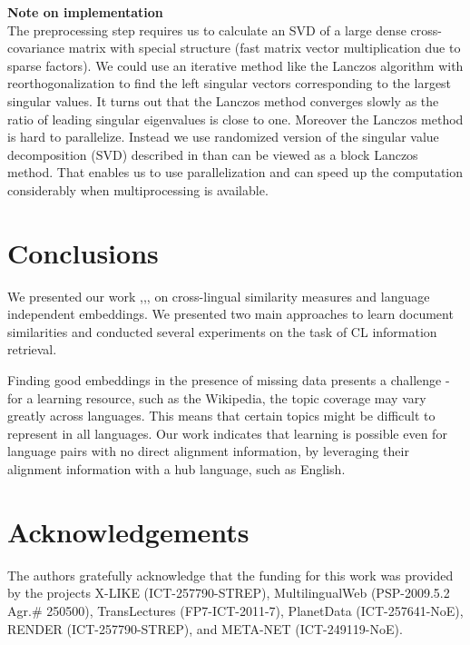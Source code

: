 \documentclass{article} %
\begin{document}
\textbf{Note on implementation}\\
The preprocessing step requires us to calculate an SVD of a large dense cross-covariance matrix with special structure (fast matrix vector multiplication due to sparse factors). We could use an iterative method like the Lanczos algorithm\cite{golub} with reorthogonalization to find the left singular vectors corresponding to the largest singular values. It turns out that the Lanczos method converges slowly as the ratio of leading singular eigenvalues is close to one. Moreover the Lanczos method is hard to parallelize. Instead we use randomized version of the singular value decomposition (SVD) described in \cite{tropp} than can be viewed as a block Lanczos method. That enables us to use parallelization and can speed up the computation considerably when multiprocessing is available.

\section{Conclusions}

We presented our work \cite{nips},\cite{nips2},\cite{sikdd},\cite{nips3} on cross-lingual similarity measures and language independent embeddings. We presented two main approaches to learn document similarities and conducted several experiments on the task of CL information retrieval.

Finding good embeddings in the presence of missing data presents a challenge - for a learning resource, such as the Wikipedia, the topic coverage may vary greatly across languages.  This means that certain topics might be difficult to represent in all languages. Our work indicates that learning is possible even for language pairs with no direct  alignment information, by leveraging their alignment information with a hub language, such as English.

\section{Acknowledgements}
The authors gratefully acknowledge that the funding for this work was provided by the projects X-LIKE (ICT-257790-STREP)\cite{xlike},  MultilingualWeb (PSP-2009.5.2 Agr.\# 250500)\cite{mlweb}, TransLectures (FP7-ICT-2011-7)\cite{translectures}, PlanetData (ICT-257641-NoE)\cite{pdata}, RENDER (ICT-257790-STREP)\cite{render}, and META-NET (ICT-249119-NoE)\cite{metanet}.



\end{document}
